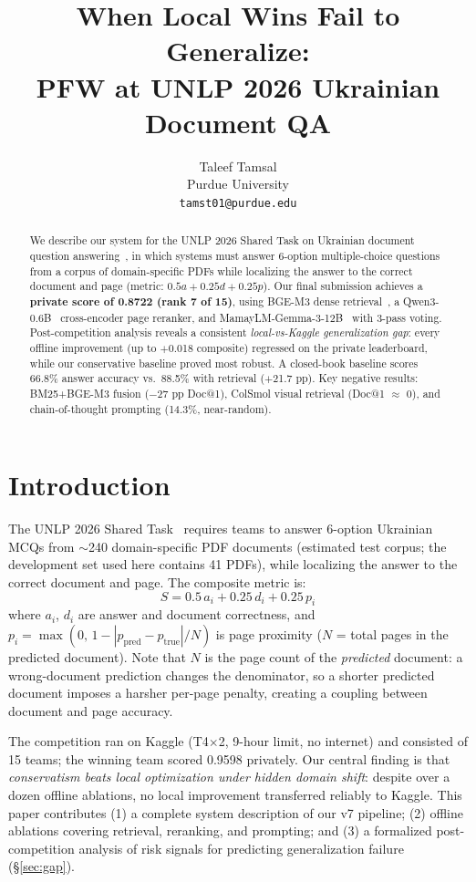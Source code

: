 \documentclass[11pt]{article}
\title{When Local Wins Fail to Generalize: \\
PFW at UNLP 2026 Ukrainian Document QA}
\author{
  Taleef Tamsal \\
  Purdue University \\
  {\small\texttt{tamst01@purdue.edu}}
}
\date{}
\begin{document}
\maketitle

\begin{abstract}
We describe our system for the UNLP 2026 Shared Task on Ukrainian document question answering~\cite{unlp2026task}, in which systems must answer 6-option multiple-choice questions from a corpus of domain-specific PDFs while localizing the answer to the correct document and page (metric: $0.5a + 0.25d + 0.25p$).
Our final submission achieves a \textbf{private score of 0.8722 (rank 7 of 15)}, using BGE-M3 dense retrieval~\cite{chen2024bge}, a Qwen3-0.6B~\cite{qwen3_2025} cross-encoder page reranker, and MamayLM-Gemma-3-12B~\cite{mamaylm2025} with 3-pass voting.
Post-competition analysis reveals a consistent \textit{local-vs-Kaggle generalization gap}: every offline improvement (up to $+$0.018 composite) regressed on the private leaderboard, while our conservative baseline proved most robust.
A closed-book baseline scores 66.8\% answer accuracy vs.\ 88.5\% with retrieval ($+$21.7 pp). Key negative results: BM25+BGE-M3 fusion ($-$27 pp Doc@1), ColSmol visual retrieval (Doc@1 $\approx$ 0), and chain-of-thought prompting (14.3\%, near-random).
\end{abstract}

\section{Introduction}

The UNLP 2026 Shared Task~\cite{unlp2026task} requires teams to answer 6-option Ukrainian MCQs from $\sim$240 domain-specific PDF documents (estimated test corpus; the development set used here contains 41 PDFs), while localizing the answer to the correct document and page.
The composite metric is:
\begin{equation}
  S = 0.5\,a_i + 0.25\,d_i + 0.25\,p_i
  \label{eq:metric}
\end{equation}
where $a_i$, $d_i$ are answer and document correctness, and $p_i = \max(0,\,1 - |p_\text{pred}-p_\text{true}|/N)$ is page proximity ($N$ = total pages in the predicted document). Note that $N$ is the page count of the \emph{predicted} document: a wrong-document prediction changes the denominator, so a shorter predicted document imposes a harsher per-page penalty, creating a coupling between document and page accuracy.

The competition ran on Kaggle (T4$\times$2, 9-hour limit, no internet) and consisted of 15 teams; the winning team scored 0.9598 privately.
Our central finding is that \textit{conservatism beats local optimization under hidden domain shift}: despite over a dozen offline ablations, no local improvement transferred reliably to Kaggle.
This paper contributes (1) a complete system description of our v7 pipeline; (2) offline ablations covering retrieval, reranking, and prompting; and (3) a formalized post-competition analysis of risk signals for predicting generalization failure (\S\ref{sec:gap}).
\end{document}
